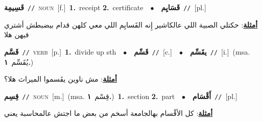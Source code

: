 \documentclass[10pt,a4paper,twoside]{article} %
\begin{document}
\begin{multicols}{2}
{\setlength\topsep{0pt}\textbf{\foreignlanguage{arabic}{قَسِيمِة}}\ {\color{gray}\texttt{//}\color{black}}\ \textsc{noun}\ [f.]\ \textbf{1.}~receipt  \textbf{2.}~certificate\ \ $\bullet$\ \ \setlength\topsep{0pt}\textbf{\foreignlanguage{arabic}{قَسَايِم}}\ {\color{gray}\texttt{//}\color{black}}\ [pl.]\  \begin{flushright}\color{gray}\foreignlanguage{arabic}{\textbf{\underline{\foreignlanguage{arabic}{أمثلة}}}: حكتلي الصبية اللي عالكاشير إِنه القَسايِم اللي معي كلهن قدام بيضبطش أشتري فيهن هلا}\end{flushright}\color{black}} \vspace{2mm}

{\setlength\topsep{0pt}\textbf{\foreignlanguage{arabic}{قَسَّم}}\ {\color{gray}\texttt{//}\color{black}}\ \textsc{verb}\ [p.]\ \textbf{1.}~divide up sth\ \ $\bullet$\ \ \setlength\topsep{0pt}\textbf{\foreignlanguage{arabic}{قَسِّم}}\ {\color{gray}\texttt{//}\color{black}}\ [c.]\ \ $\bullet$\ \ \setlength\topsep{0pt}\textbf{\foreignlanguage{arabic}{يقَسِّم}}\ {\color{gray}\texttt{//}\color{black}}\ [i.]\ \color{gray}(msa. \foreignlanguage{arabic}{يُقَسِّم}~\foreignlanguage{arabic}{\textbf{١.}})\color{black}\  \begin{flushright}\color{gray}\foreignlanguage{arabic}{\textbf{\underline{\foreignlanguage{arabic}{أمثلة}}}: مش ناوين يقَسموا الميراث هلا؟}\end{flushright}\color{black}} \vspace{2mm}

{\setlength\topsep{0pt}\textbf{\foreignlanguage{arabic}{قِسِم}}\ {\color{gray}\texttt{//}\color{black}}\ \textsc{noun}\ [m.]\ \color{gray}(msa. \foreignlanguage{arabic}{قِسْم}~\foreignlanguage{arabic}{\textbf{١.}})\color{black}\ \textbf{1.}~section  \textbf{2.}~part\ \ $\bullet$\ \ \setlength\topsep{0pt}\textbf{\foreignlanguage{arabic}{أَقْسَام}}\ {\color{gray}\texttt{//}\color{black}}\ [pl.]\  \begin{flushright}\color{gray}\foreignlanguage{arabic}{\textbf{\underline{\foreignlanguage{arabic}{أمثلة}}}: كل الأقْسام بهالجامعة أسخم من بعض ما اجتش عالمحاسبة يعني}\end{flushright}\color{black}} \vspace{2mm}


\end{multicols}
\end{document}
